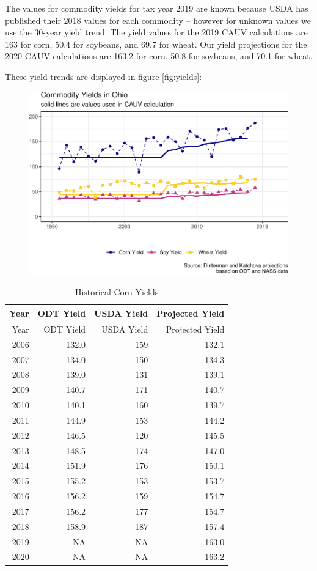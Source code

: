 \documentclass[]{article}
\begin{document}
The values for commodity yields for tax year 2019 are known because USDA
has published their 2018 values for each commodity -- however for
unknown values we use the 30-year yield trend. The yield values for the
2019 CAUV calculations are 163 for corn, 50.4 for soybeans, and 69.7 for
wheat. Our yield projections for the 2020 CAUV calculations are 163.2
for corn, 50.8 for soybeans, and 70.1 for wheat.

These yield trends are displayed in figure \ref{fig:yields}:

\begin{figure}[H]
\includegraphics[width=1\linewidth]{4-projections-2019-2020_files/figure-latex/viz-yields-1} \caption{\label{fig:yields}}\label{fig:viz-yields}
\end{figure}

\begin{longtable}[]{@{}rrrr@{}}
\caption{Historical Corn Yields}\tabularnewline
\toprule
Year & ODT Yield & USDA Yield & Projected Yield\tabularnewline
\midrule
\endfirsthead
\toprule
Year & ODT Yield & USDA Yield & Projected Yield\tabularnewline
\midrule
\endhead
2006 & 132.0 & 159 & 132.1\tabularnewline
2007 & 134.0 & 150 & 134.3\tabularnewline
2008 & 139.0 & 131 & 139.1\tabularnewline
2009 & 140.7 & 171 & 140.7\tabularnewline
2010 & 140.1 & 160 & 139.7\tabularnewline
2011 & 144.9 & 153 & 144.2\tabularnewline
2012 & 146.5 & 120 & 145.5\tabularnewline
2013 & 148.5 & 174 & 147.0\tabularnewline
2014 & 151.9 & 176 & 150.1\tabularnewline
2015 & 155.2 & 153 & 153.7\tabularnewline
2016 & 156.2 & 159 & 154.7\tabularnewline
2017 & 156.2 & 177 & 154.7\tabularnewline
2018 & 158.9 & 187 & 157.4\tabularnewline
2019 & NA & NA & 163.0\tabularnewline
2020 & NA & NA & 163.2\tabularnewline
\bottomrule
\end{longtable}
\end{document}
